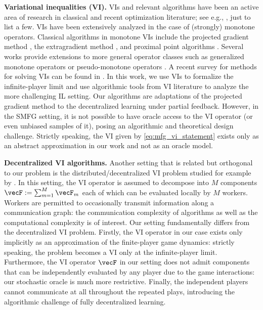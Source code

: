 \textbf{Variational inequalities (VI).}
VIs and relevant algorithms have been an active area of research in classical and recent optimization literature; see e.g., \citet{nemirovski2004prox, facchinei2003finite, nesterov2007dual,lin2022perseus, kotsalis2022simple}, just to list a few.
VIs have been extensively analyzed in the case of (strongly) monotone operators.
Classical algorithms in monotone VIs include the projected gradient method \citep{facchinei2003finite}, the extragradient method \citep{korpelevich1976extragradient}, and proximal point algorithms \citep{rockafellar1976monotone}.
Several works provide extensions to more general operator classes such as generalized monotone operators \citep{kotsalis2022simple} or pseudo-monotone operators \citep{karamardian1976complementarity}.
A recent survey for methods for solving VIs can be found in \citet{beznosikov2023smooth}.
In this work, we use VIs to formalize the infinite-player limit and use algorithmic tools from VI literature to analyze the more challenging IL setting.
Our algorithms are adaptations of the projected gradient method to the decentralized learning under partial feedback.
However, in the SMFG setting, it is not possible to have oracle access to the VI operator (or even unbiased samples of it), posing an algorithmic and theoretical design challenge.
Strictly speaking, the VI given by \eqref{eq:mfg_vi_statement} exists only as an abstract approximation in our work and not as an oracle model.

\textbf{Decentralized VI algorithms.}
Another setting that is related but orthogonal to our problem is the distributed/decentralized VI problem studied for example by \citet{srivastava2011distributed, mukherjee2020decentralized, kovalev2022optimal}.
In this setting, the VI operator is assumed to decompose into $M$ components $\vecF := \sum_{m=1}^M \vecF_m$ each of which can be evaluated locally by $M$ workers.
Workers are permitted to occasionally transmit information along a communication graph: the communication complexity of algorithms as well as the computational complexity is of interest.
Our setting fundamentally differs from the decentralized VI problem. 
Firstly, the VI operator in our case exists only implicitly as an approximation of the finite-player game dynamics: strictly speaking, the problem becomes a VI only at the infinite-player limit.
Furthermore, the VI operator $\vecF$ in our setting does not admit components that can be independently evaluated by any player due to the game interactions: our stochastic oracle is much more restrictive.
Finally, the independent players cannot communicate at all throughout the repeated plays, introducing the algorithmic challenge of fully decentralized learning.

